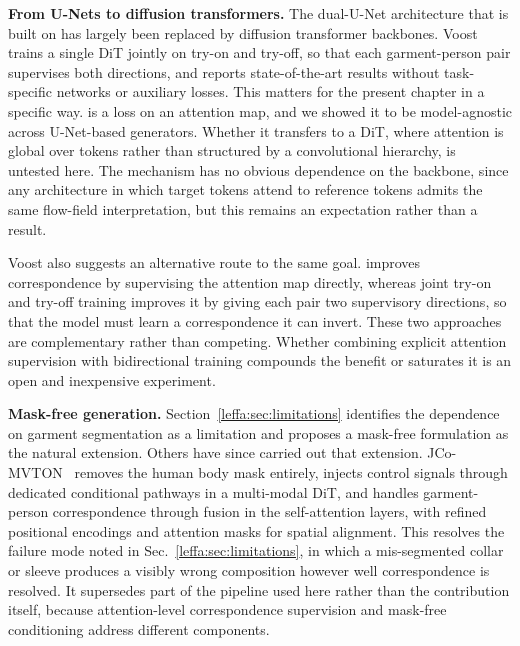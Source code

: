 \noindent \textbf{From U-Nets to diffusion transformers.}
The dual-U-Net architecture that \leffa{} is built on has largely been replaced by diffusion transformer backbones. Voost~\citep{lee2025voost} trains a single DiT jointly on try-on and try-off, so that each garment-person pair supervises both directions, and reports state-of-the-art results without task-specific networks or auxiliary losses. This matters for the present chapter in a specific way. \leffa{} is a loss on an attention map, and we showed it to be model-agnostic across U-Net-based generators. Whether it transfers to a DiT, where attention is global over tokens rather than structured by a convolutional hierarchy, is untested here. The mechanism has no obvious dependence on the backbone, since any architecture in which target tokens attend to reference tokens admits the same flow-field interpretation, but this remains an expectation rather than a result.

Voost also suggests an alternative route to the same goal. \leffa{} improves correspondence by supervising the attention map directly, whereas joint try-on and try-off training improves it by giving each pair two supervisory directions, so that the model must learn a correspondence it can invert. These two approaches are complementary rather than competing. Whether combining explicit attention supervision with bidirectional training compounds the benefit or saturates it is an open and inexpensive experiment.

\noindent \textbf{Mask-free generation.}
Section~\ref{leffa:sec:limitations} identifies the dependence on garment segmentation as a limitation and proposes a mask-free formulation as the natural extension. Others have since carried out that extension. JCo-MVTON~\citep{wang2025jco} removes the human body mask entirely, injects control signals through dedicated conditional pathways in a multi-modal DiT, and handles garment-person correspondence through fusion in the self-attention layers, with refined positional encodings and attention masks for spatial alignment. This resolves the failure mode noted in Sec.~\ref{leffa:sec:limitations}, in which a mis-segmented collar or sleeve produces a visibly wrong composition however well correspondence is resolved. It supersedes part of the pipeline used here rather than the contribution itself, because attention-level correspondence supervision and mask-free conditioning address different components.

